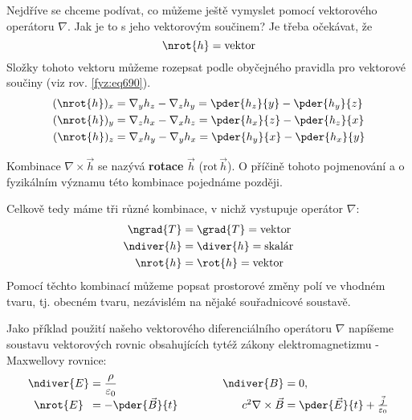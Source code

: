         Nejdříve se chceme podívat, co můžeme ještě vymyslet pomocí vektorového operátoru $\nabla$. 
        Jak je to s jeho vektorovým součinem? Je třeba očekávat, že
        \begin{equation}\label{fyz:eq265}
          \nrot{h} = \text{vektor}
        \end{equation}
        Složky tohoto vektoru můžeme rozepsat podle obyčejného pravidla pro vektorové součiny (viz 
        rov. \ref{fyz:eq690}).
        \begin{align*}
          (\nrot{h})_x &= \nabla_yh_z-\nabla_zh_y = \pder{h_z}{y} - \pder{h_y}{z} \\
          (\nrot{h})_y &= \nabla_zh_x-\nabla_xh_z = \pder{h_x}{z} - \pder{h_z}{x} \\
          (\nrot{h})_z &= \nabla_xh_y-\nabla_yh_x = \pder{h_y}{x} - \pder{h_x}{y}
        \end{align*}
  
        Kombinace $\nabla\times\vec{h}$ se nazývá \textbf{rotace} $\vec{h}$
        ($\mathrm{rot}\,\vec{h}$). O příčině tohoto pojmenování a o fyzikálním významu této
        kombinace pojednáme později.
  
        Celkově tedy máme tři různé kombinace, v nichž vystupuje operátor $\nabla$:
        \begin{align*}
          \ngrad{T}  &=\grad{T}   = \text{vektor} \\    
          \ndiver{h} &=\diver{h}  = \text{skalár} \\  
          \nrot{h}   &=\rot{h}    = \text{vektor}
        \end{align*}
        Pomocí těchto kombinací můžeme popsat prostorové změny polí ve vhodném tvaru, tj. obecném 
        tvaru, nezávislém na nějaké souřadnicové soustavě.
  
        Jako příklad použití našeho vektorového diferenciálního operátoru $\nabla$ napíšeme soustavu
        vektorových rovnic obsahujících tytéž zákony elektromagnetizmu - Maxwellovy rovnice:
        \begin{equation}\label{fyz:eq266}
          \begin{array}{c @{{}={}} l r @{{}={}} l}
            \ndiver{E} & \dfrac{\rho}{\varepsilon_0}& \ndiver{B}   & 0,                          \\
            \nrot{E}   & -\pder{\vec{B}}{t}   \quad\quad\quad   & c^2\nabla\times\vec{B} & 
            \pder{\vec{E}}{t} + \frac{\vec{j}}{\varepsilon_0}  
          \end{array}
        \end{equation}
  
